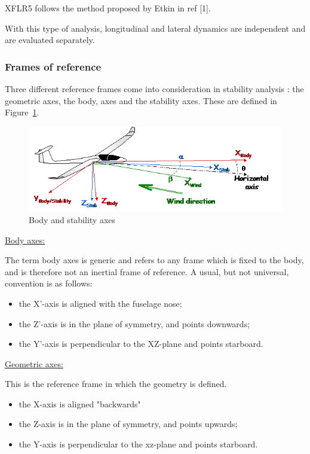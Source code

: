 \documentclass[a4paper,twoside,12pt,dvips]{article}
\begin{document}
XFLR5 follows the method proposed by Etkin in ref [1].

With this type of analysis, longitudinal and lateral dynamics are
independent and are evaluated separately.

\subsubsection{Frames of reference}

Three different reference frames come into consideration in stability
analysis : the geometric axes, the body, axes and the stability axes.
These are defined in Figure~\ref{fig:body_and_stability_axes}.

\begin{figure}[htbp]
  \includegraphics[width=0.8\linewidth]{img-46}\centering 
  \caption{Body and stability axes}
  \label{fig:body_and_stability_axes}
\end{figure}

\underline{Body axes:}

The term body axes is generic and refers to any frame which is fixed to
the body, and is therefore not an inertial frame of reference. A usual,
but not universal, convention is as follows:

\begin{itemize}
\item the X'-axis is aligned with the
fuselage nose;
\item the Z'-axis is in the plane of
symmetry, and points downwards;
\item the Y'-axis is perpendicular to the
XZ-plane and points starboard.
\end{itemize}

\underline{Geometric axes:}

This is the reference frame in which the geometry is defined.

\begin{itemize}
\item the X-axis is aligned
"backwards"
\item the Z-axis is in the plane of symmetry, and points
upwards;
\item the Y-axis is perpendicular to the xz-plane and points
starboard.
\end{itemize}
\end{document}
